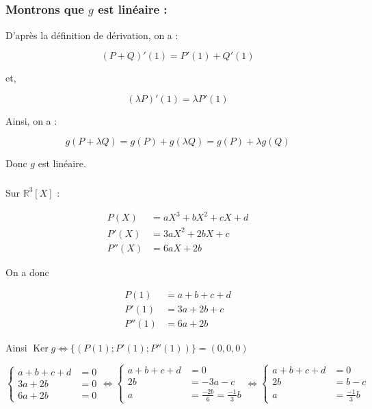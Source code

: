 \documentclass[a4paper,12pt]{article}
\DeclareMathOperator{\Ker}{Ker}
\begin{document}
\subsection{}

\subsubsection{Montrons que $g$ est linéaire :}

D'après la définition de dérivation, on a :

\[ 
  (P+Q)'(1) = P'(1)+Q'(1)
\]

et,

\[ 
  (\lambda P)'(1)=\lambda P'(1)
\]

Ainsi, on a : %

\[
  g(P+\lambda Q) = g(P)+g(\lambda Q) = g(P) + \lambda g(Q)
\]

Donc $g$ est linéaire.

\subsubsection{}

Sur $\mathbb{R}^3[X]$ :

\begin{align*}
  P(X)   & = aX^3 +bX^2+cX+d \\
  P'(X)  & = 3aX^2+2bX+c     \\
  P''(X) & = 6aX+2b         
\end{align*}

On a donc

\begin{align*}
  P(1)   & = a+b+c+d \\
  P'(1)  & = 3a+2b+c  \\
  P''(1) & = 6a+2b
\end{align*}

Ainsi $\Ker g \Leftrightarrow \{(P(1);P'(1);P''(1))\} = {(0,0,0)}$

\[
  \left\{\begin{array}{rl}
    a+b+c+d & = 0 \\
    3a+2b   & = 0 \\
    6a+2b   & =0
  \end{array} \right.
  \Leftrightarrow
  \left\{\begin{array}{rl}
    a+b+c+d & = 0                             \\
    2b      & = -3a-c                         \\
    a       & = \frac{-2b}{6} = \frac{-1}{3}b
  \end{array}\right.
  \Leftrightarrow
  \left\{\begin{array}{rl}
    a+b+c+d & = 0             \\
    2b      & = b-c           \\
    a       & = \frac{-1}{3}b
  \end{array}\right.
\]
\end{document}
